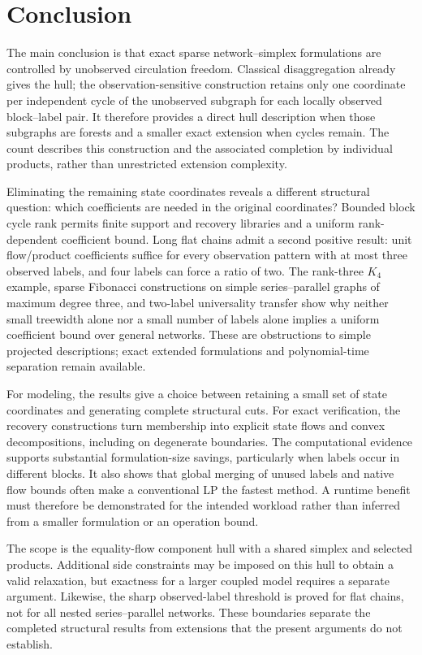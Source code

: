 \section{Conclusion}\label{sec:conclusion}
The main conclusion is that exact sparse network--simplex formulations are
controlled by unobserved circulation freedom. Classical disaggregation
already gives the hull; the observation-sensitive construction retains only
one coordinate per independent cycle of the unobserved subgraph for each
locally observed block--label pair. It therefore provides a direct hull description when those
subgraphs are forests and a smaller exact extension when cycles remain.
The count describes this construction and the associated completion by
individual products, rather than unrestricted extension complexity.

Eliminating the remaining state coordinates reveals a different structural
question: which coefficients are needed in the original coordinates?
Bounded block cycle rank permits finite support and recovery libraries and
a uniform rank-dependent coefficient bound. Long flat chains admit a second
positive result: unit flow/product coefficients suffice for every observation
pattern with at most three observed labels, and four labels can force a
ratio of two. The rank-three $K_4$ example, sparse Fibonacci constructions
on simple series--parallel graphs of maximum degree three, and two-label
universality transfer show why neither small treewidth alone nor a small
number of labels alone implies a uniform coefficient bound over general
networks. These are obstructions to simple projected descriptions; exact
extended formulations and polynomial-time separation remain available.

For modeling, the results give a choice between retaining a small set of
state coordinates and generating complete structural cuts. For exact
verification, the recovery constructions turn membership into explicit
state flows and convex decompositions, including on degenerate boundaries.
The computational evidence supports substantial formulation-size savings,
particularly when labels occur in different blocks. It also shows that
global merging of unused labels and native flow bounds often make a
conventional LP the fastest method. A runtime benefit must therefore be
demonstrated for the intended workload rather than inferred from a smaller
formulation or an operation bound.

The scope is the equality-flow component hull with a shared simplex and
selected products. Additional side constraints may be imposed on this hull
to obtain a valid relaxation, but exactness for a larger coupled model
requires a separate argument. Likewise, the sharp observed-label threshold
is proved for flat chains, not for all nested series--parallel networks.
These boundaries separate the completed structural results from extensions
that the present arguments do not establish.
